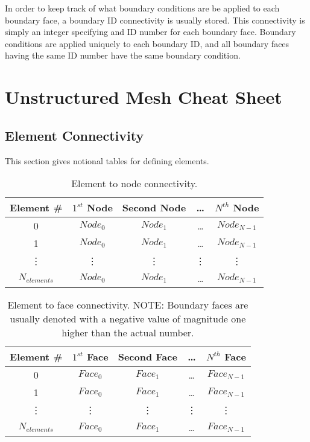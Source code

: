 \documentclass[letterpaper]{article}
\begin{document}
In order to keep track of what boundary conditions are be applied to each boundary face, a boundary ID connectivity is usually stored.  This connectivity is simply an integer specifying and ID number for each boundary face.  Boundary conditions are applied uniquely to each boundary ID, and all boundary faces having the same ID number have the same boundary condition.    

\section{Unstructured Mesh Cheat Sheet}
\subsection{Element Connectivity}
This section gives notional tables for defining elements.  
\begin{table}[h!]
\centering
\begin{tabular}{|ccccc|}
\hline
Element \#  & $1^{st}$ Node  & Second Node & \dots & $N^{th}$ Node \\
\hline
 0 & $Node_{0}$ & $Node_{1}$ & \dots & $Node_{N-1}$ \\
 1 & $Node_{0}$ & $Node_{1}$ & \dots & $Node_{N-1}$ \\
  \vdots & \vdots & \vdots & \vdots & \vdots \\
  $N_{elements}$ & $Node_{0}$ & $Node_{1}$ & \dots & $Node_{N-1}$ \\
\hline 
\end{tabular}
\caption{Element to node connectivity.}
\end{table}

\begin{table}[h!]
\centering
\begin{tabular}{|c|cccc|}
\hline
Element \#  & $1^{st}$ Face  & Second Face & \dots & $N^{th}$ Face \\
\hline
 0 & $Face_{0}$ & $Face_{1}$ & \dots & $Face_{N-1}$ \\
 1 & $Face_{0}$ & $Face_{1}$ & \dots & $Face_{N-1}$ \\
  \vdots & \vdots & \vdots & \vdots & \vdots \\
  $N_{elements}$ & $Face_{0}$ & $Face_{1}$ & \dots & $Face_{N-1}$ \\
\hline 
\end{tabular}
\caption{Element to face connectivity.  NOTE: Boundary faces are usually denoted with a negative value of magnitude one higher than the actual number. }
\end{table}
\end{document}
